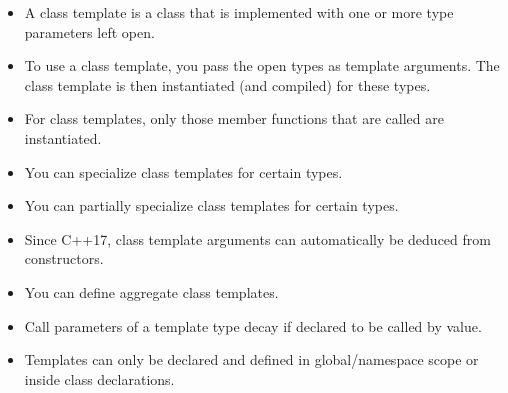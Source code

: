
\begin{itemize}
\item 
A class template is a class that is implemented with one or more type parameters left open.

\item 
To use a class template, you pass the open types as template arguments. The class template is then instantiated (and compiled) for these types.

\item 
For class templates, only those member functions that are called are instantiated.

\item 
You can specialize class templates for certain types.

\item 
You can partially specialize class templates for certain types.

\item 
Since C++17, class template arguments can automatically be deduced from constructors.

\item 
You can define aggregate class templates.

\item 
Call parameters of a template type decay if declared to be called by value.

\item 
Templates can only be declared and defined in global/namespace scope or inside class declarations.
\end{itemize}